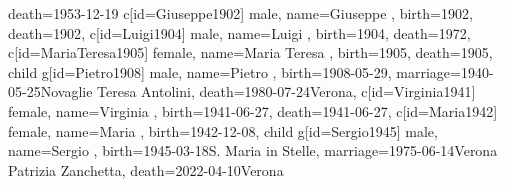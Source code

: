 \documentclass{article}
\begin{document}
\begin{midpage}
\begin{center}
\begin{genealogypicture}
{{{{{{{{{                                    death={1953-12-19}{}
                                }
                                c[id=Giuseppe1902]{
                                    male,
                                    name={Giuseppe },
                                    birth={1902}{},
                                    death={1902}{},
                                }
                                c[id=Luigi1904]{
                                    male,
                                    name={Luigi },
                                    birth={1904}{},
                                    death={1972}{},
                                }
                                c[id=MariaTeresa1905]{
                                    female,
                                    name={Maria Teresa },
                                    birth={1905}{},
                                    death={1905}{},
                                }
                                child{
                                    g[id=Pietro1908]{
                                        male,
                                        name={Pietro },
                                        birth={1908-05-29}{},
                                        marriage={1940-05-25}{Novaglie \newline Teresa Antolini},
                                        death={1980-07-24}{Verona},
                                    }
                                    c[id=Virginia1941]{
                                        female,
                                        name={Virginia },
                                        birth={1941-06-27}{},
                                        death={1941-06-27}{},
                                    }
                                    c[id=Maria1942]{
                                        female,
                                        name={Maria },
                                        birth={1942-12-08}{},
                                    }
                                    child{
                                        g[id=Sergio1945]{
                                            male,
                                            name={Sergio },
                                            birth={1945-03-18}{S. Maria in Stelle},
                                            marriage={1975-06-14}{Verona \newline Patrizia Zanchetta},
                                            death={2022-04-10}{Verona}
}}}}}}}}}}}
\end{genealogypicture}
\end{center}
\end{midpage}
\end{document}
